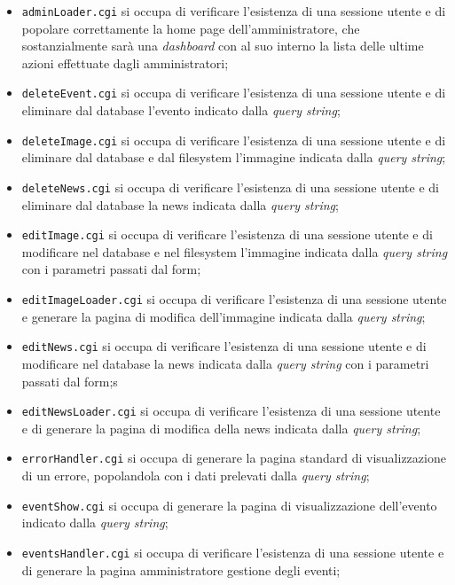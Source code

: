 \begin{itemize}

	\item \texttt{adminLoader.cgi} si occupa di verificare l'esistenza di una sessione utente e di popolare correttamente la home page dell'amministratore, che sostanzialmente sarà una \textit{dashboard} con al suo interno la lista delle ultime azioni effettuate dagli amministratori;
	\item \texttt{deleteEvent.cgi} si occupa di verificare l'esistenza di una sessione utente e di eliminare dal database l'evento indicato dalla \textit{query string};
	\item \texttt{deleteImage.cgi} si occupa di verificare l'esistenza di una sessione utente e di eliminare dal database e dal filesystem l'immagine indicata dalla \textit{query string};
	\item \texttt{deleteNews.cgi} si occupa di verificare l'esistenza di una sessione utente e di eliminare dal database la news indicata dalla \textit{query string};
	\item \texttt{editImage.cgi} si occupa di verificare l'esistenza di una sessione utente e di modificare nel database e nel filesystem l'immagine indicata dalla \textit{query string} con i parametri passati dal form;
	\item \texttt{editImageLoader.cgi} si occupa di verificare l'esistenza di una sessione utente e generare la pagina di modifica dell'immagine indicata dalla \textit{query string};
	\item \texttt{editNews.cgi} si occupa di verificare l'esistenza di una sessione utente e di modificare nel database la news indicata dalla \textit{query string} con i parametri passati dal form;s
	\item \texttt{editNewsLoader.cgi} si occupa di verificare l'esistenza di una sessione utente e di generare la pagina di modifica della news indicata dalla \textit{query string};
	\item \texttt{errorHandler.cgi} si occupa di generare la pagina standard di visualizzazione di un errore, popolandola con i dati prelevati dalla \textit{query string};
	\item \texttt{eventShow.cgi} si occupa di generare la pagina di visualizzazione dell'evento indicato dalla \textit{query string};
	\item \texttt{eventsHandler.cgi} si occupa di verificare l'esistenza di una sessione utente e di generare la pagina amministratore gestione degli eventi;

\end{itemize} 
